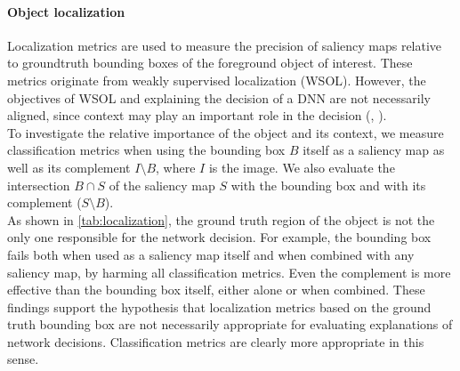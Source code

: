 \paragraph{Object localization}
\label{sec:oc_loc}
Localization metrics are used to measure the precision of saliency maps relative to groundtruth 
bounding boxes of the foreground object of interest. These metrics originate from weakly supervised 
localization (WSOL). However, the objectives of WSOL and explaining the decision of a DNN are not 
necessarily aligned, since context may play an important role in the decision (\cite{shetty2019not}, 
\cite{rao2022towards}).\\

\noindent To investigate the relative importance of the object and its context, we measure 
classification metrics when using the bounding box $B$ itself as a saliency map as well as its 
complement $I \setminus B$, where $I$ is the image. We also evaluate the intersection $B \cap S$ 
of the saliency map $S$ with the bounding box and with its complement ($S \setminus B$).\\

\noindent As shown in \autoref{tab:localization}, the ground truth region of the object is not the 
only one responsible for the network decision. For example, the bounding box fails both when used 
as a saliency map itself and when combined with any saliency map, by harming all classification 
metrics. Even the complement is more effective than the bounding box itself, either alone or when 
combined. These findings support the hypothesis that localization metrics based on the ground truth 
bounding box are not necessarily appropriate for evaluating explanations of network decisions. 
Classification metrics are clearly more appropriate in this sense.\\


